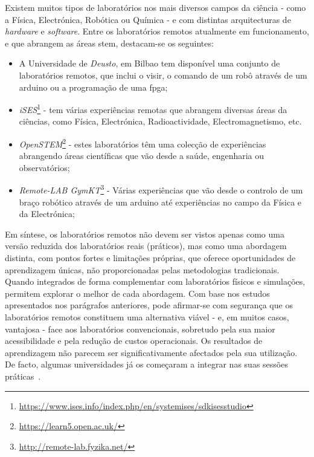 Existem muitos tipos de laboratórios nos mais diversos campos da ciência - como a Física, Electrónica, Robótica ou Química - e com distintas arquitecturas de \textit{hardware} e \textit{software}. Entre os laboratórios remotos atualmente em funcionamento, e que abrangem as áreas \acrshort{stem}, destacam-se os seguintes:
\begin{itemize}
    \item A Universidade de \textit{Deusto}, em Bilbao tem disponível uma conjunto de laboratórios remotos, que inclui o \acrshort{visir}, o comando de um robô através de um \gls{arduino} ou a programação de uma \acrfull{fpga};
    \item \textit{iSES}\footnote{\url{https://www.ises.info/index.php/en/systemises/sdkisesstudio}} - tem várias experiências remotas que abrangem diversas áreas da ciências, como Física, Electrónica, Radioactividade, Electromagnetismo, etc.
    \item \textit{OpenSTEM}\footnote{\url{https://learn5.open.ac.uk/}} - estes laboratórios têm uma colecção de experiências abrangendo áreas científicas que vão desde a saúde, engenharia ou observatórios;
    \item \textit{Remote-LAB GymKT}\footnote{\url{http://remote-lab.fyzika.net/}} - Várias experiências que vão desde o controlo de um braço robótico através de um \gls{arduino} até experiências no campo da Física e da Electrónica;
\end{itemize}

Em síntese, os laboratórios remotos não devem ser vistos apenas como uma versão reduzida dos laboratórios reais (práticos), mas como uma abordagem distinta, com pontos fortes e limitações próprias, que oferece oportunidades de aprendizagem únicas, não proporcionadas pelas metodologias tradicionais. Quando integrados de forma complementar com laboratórios físicos e simulações, permitem explorar o melhor de cada abordagem.
Com base nos estudos apresentados nos parágrafos anteriores, pode afirmar-se com segurança que os laboratórios remotos constituem uma alternativa viável - e, em muitos casos, vantajosa - face aos laboratórios convencionais, sobretudo pela sua maior acessibilidade e pela redução de custos operacionais. Os resultados de aprendizagem não parecem ser significativamente afectados pela sua utilização. De facto, algumas universidades já os começaram a integrar nas suas sessões práticas~\cite{VISIREngineeringPractices}.

